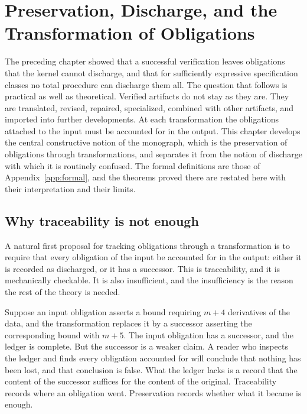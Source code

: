 \chapter[Preservation, Discharge, and Transformation]{Preservation, Discharge, and the Transformation of Obligations}
\label{ch:preservation}

The preceding chapter showed that a successful verification leaves obligations that the kernel cannot discharge, and that for sufficiently expressive specification classes no total procedure can discharge them all. The question that follows is practical as well as theoretical. Verified artifacts do not stay as they are. They are translated, revised, repaired, specialized, combined with other artifacts, and imported into further developments. At each transformation the obligations attached to the input must be accounted for in the output. This chapter develops the central constructive notion of the monograph, which is the preservation of obligations through transformations, and separates it from the notion of discharge with which it is routinely confused. The formal definitions are those of Appendix~\ref{app:formal}, and the theorems proved there are restated here with their interpretation and their limits.

\section{Why traceability is not enough}

A natural first proposal for tracking obligations through a transformation is to require that every obligation of the input be accounted for in the output: either it is recorded as discharged, or it has a successor. This is traceability, and it is mechanically checkable. It is also insufficient, and the insufficiency is the reason the rest of the theory is needed.

Suppose an input obligation asserts a bound requiring $m+4$ derivatives of the data, and the transformation replaces it by a successor asserting the corresponding bound with $m+5$. The input obligation has a successor, and the ledger is complete. But the successor is a weaker claim. A reader who inspects the ledger and finds every obligation accounted for will conclude that nothing has been lost, and that conclusion is false. What the ledger lacks is a record that the content of the successor suffices for the content of the original. Traceability records where an obligation went. Preservation records whether what it became is enough.


